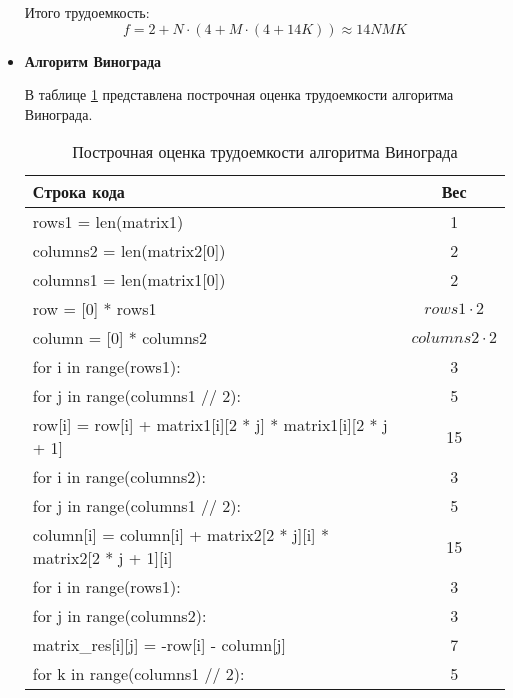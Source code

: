 \begin{itemize}
    
    Итого трудоемкость:
    \begin{equation}
        f = 2 + N \cdot (4 + M \cdot (4 + 14K)) \approx 14NMK
    \end{equation}
        
    \clearpage
    \item \textbf{Алгоритм Винограда}
    
    В таблице \ref{tbl:vinograd} представлена построчная оценка трудоемкости алгоритма Винограда.
    \begin{table}[h]
    \begin{center}
        \begin{threeparttable}
        \captionsetup{justification=raggedright}
        \caption{\label{tbl:vinograd}Построчная оценка трудоемкости алгоритма Винограда}
        \begin{tabular}{|l|c|}
            \hline
            Строка кода & Вес \\
            \hline
            rows1 = len(matrix1) & 1 \\ 
            \hline
            columns2 = len(matrix2[0]) & 2 \\ 
            \hline
            columns1 = len(matrix1[0]) & 2 \\ 
            \hline
            row = [0] * rows1 & $rows1 \cdot 2$ \\ 
            \hline
            column = [0] * columns2 & $columns2 \cdot 2$\\ 
            \hline
            for i in range(rows1): & 3 \\ 
            \hline
            for j in range(columns1 // 2): & 5 \\ 
            \hline
            row[i] = row[i] + matrix1[i][2 * j] * matrix1[i][2 * j + 1] & 15 \\ 
            \hline
            for i in range(columns2): & 3 \\ 
            \hline
            for j in range(columns1 // 2): & 5 \\ 
            \hline
            column[i] = column[i] + matrix2[2 * j][i] * matrix2[2 * j + 1][i] & 15 \\ 
            \hline
            for i in range(rows1): & 3\\ 
            \hline
            for j in range(columns2): & 3 \\ 
            \hline
            matrix\_res[i][j] = -row[i] - column[j] & 7 \\ 
            \hline
            for k in range(columns1 // 2): & 5 \\ 

\end{tabular}
\end{threeparttable}
\end{center}
\end{table}
\end{itemize}
